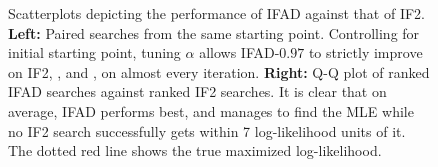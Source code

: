 \documentclass[9pt,twocolumn,pnasresearcharticle]{pnas-new}
\begin{document}
\begin{figure}[htbp!]
    \caption{Scatterplots depicting the performance of IFAD against that of IF2. \textbf{Left:} Paired searches from the same starting point. Controlling for initial starting point, tuning $\alpha$ allows IFAD-$0.97$ to strictly improve on IF2, \cite{poyiadjis11}, and \cite{naesseth18}, on almost every iteration. \textbf{Right:} Q-Q plot of ranked IFAD searches against ranked IF2 searches. It is clear that on average, IFAD performs best, and manages to find the MLE while no IF2 search successfully gets within 7 log-likelihood units of it. The dotted red line shows the true maximized log-likelihood. }
    \label{fig:scatter}
\end{figure}


  
\end{document}
